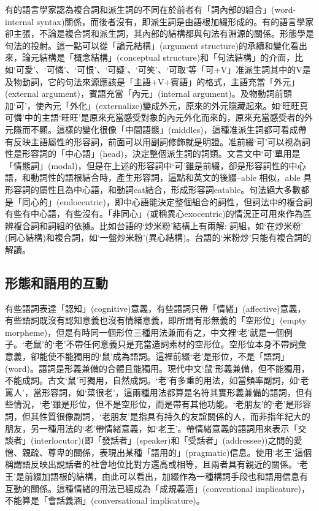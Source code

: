 \textrm{有的語言學家認為複合詞和派生詞的不同在於前者有「詞內部的組合」(word-internal syntax)關係，而後者沒有，即派生詞是由語根加綴形成的。有的語言學家卻主張，不論是複合詞和派生詞，其內部的結構都與句法有淵源的關係。形態學是句法的投射。這一點可以從「論元結構」(argument structure)的承續和變化看出來，論元結構是「概念結構」(conceptual structure)和「句法結構」的介面，比如‘可愛’}、\textrm{‘可憐’}、\textrm{‘可恨’}、\textrm{‘可疑’}、\textrm{‘可笑’}、\textrm{‘可取’等「可+V」准派生詞其中的V是及物動詞，它的句法來源應該是「主語+V+賓語」的格式，主語充當「外元」(external argument)}，\textrm{賓語充當「內元」(internal argument)}。\textrm{及物動詞前頭加‘可’}，\textrm{使內元「外化」(externalize)變成外元，原來的外元隱藏起來。如‘旺旺真可憐’中的主語‘旺旺’是原來充當感受對象的內元外化而來的，原來充當感受者的外元隱而不顯。這樣的變化很像「中間語態」(middles)}，\textrm{這種准派生詞都可看成帶有反映主語屬性的形容詞，前面可以用副詞修飾就是明證。准前綴‘可’可以視為詞性是形容詞的「中心語」(head)}，\textrm{決定整個派生詞的詞類。文言文中‘可’單用是「情態詞」(modal)}，\textrm{但是在上述的形容詞中‘可’雖是前綴，卻是形容詞性的中心語，和動詞性的語根結合時，產生形容詞，這點和英文的後綴–able 相似，able 具形容詞的屬性且為中心語，和動詞eat結合，形成形容詞eatable}。\textrm{句法絕大多數都是「同心的」(endocentric)}，\textrm{即中心語能決定整個組合的詞性，但詞法中的複合詞有些有中心語，有些沒有。「非同心」(或稱異心exocentric)的情況正可用來作為區辨複合詞和詞組的依據。比如台語的‘炒米粉’結構上有兩解: 詞組，如‘在炒米粉’ (同心結構)和複合詞，如‘一盤炒米粉’(異心結構)}。\textrm{台語的‘米粉炒’只能有複合詞的解讀。}

\subsection{\rmfamily 形態和語用的互動}

\textrm{有些語詞表達「認知」(cognitive)意義，有些語詞只帶「情緒」(affective)意義，有些語詞既沒有認知意義也沒有情緒意義，即所謂有形無義的「空形位」(empty morpheme)，但是有時同一個形位三種用法兼而有之，中文裡‘老’就是一個例子。‘老鼠’的‘老’不帶任何意義只是充當造詞素材的空形位。空形位本身不帶詞彙意義，卻能使不能獨用的‘鼠’成為語詞。這裡前綴‘老’是形位，不是「語詞」(word)。語詞是形義兼備的合體且能獨用。現代中文‘鼠’形義兼備，但不能獨用，不能成詞。古文‘鼠’可獨用，自然成詞。‘老’有多重的用法，如當頻率副詞，如‘老罵人’}，\textrm{當形容詞，如‘菜很老’}，\textrm{這兩種用法都算是名符其實形義兼備的語詞，但有些情況，‘老’雖是形位，但不是空形位，而是帶有其他功能。‘老朋友’的‘老’是形容詞，但其性質很像副詞，‘老朋友’是指具有持久的友誼關係的人，而非指年紀大的朋友，另一種用法的‘老’帶情緒意義，如‘老王’}。\textrm{帶情緒意義的語詞用來表示「交談者」(interlocutor)(即「發話者」(speaker)和「受話者」(addressee))之間的愛憎、親疏、尊卑的關係，表現出某種「語用的」(pragmatic)信息。使用‘老王’這個稱謂語反映出說話者的社會地位比對方還高或相等，且兩者具有親近的關係。‘老王’是前綴加語根的結構，由此可以看出，加綴作為一種構詞手段也和語用信息有互動的關係。這種情緒的用法已經成為「成規義涵」(conventional implicature)，不能算是「會話義涵」(conversational implicature)。}

